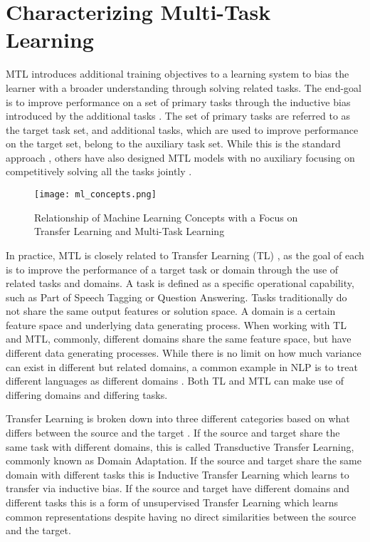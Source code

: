 \documentclass[twocolumn]{article}
\begin{document}
\section{Characterizing Multi-Task Learning}
MTL introduces additional training objectives to a learning system to bias the learner with a broader understanding through solving related tasks. The end-goal is to improve performance on a set of primary tasks through the inductive bias introduced by the additional tasks \citep{mtl97}. The set of primary tasks are referred to as the target task set, and additional tasks, which are used to improve performance on the target set, belong to the auxiliary task set. While this is the standard approach \citep{mtloverview17}, others have also designed MTL models with no auxiliary focusing on competitively solving all the tasks jointly \citep{decanlp18}.

\begin{figure*}
	\begin{center}
		\texttt{[image: ml\_concepts.png]}
		\caption{Relationship of Machine Learning Concepts with a Focus on Transfer Learning and Multi-Task Learning}
		\label{ml_concepts}
	\end{center}
\end{figure*}

In practice, MTL is closely related to Transfer Learning (TL) \citep{learn2learn98}, as the goal of each is to improve the performance of a target task or domain through the use of related tasks and domains. A task is defined as a specific operational capability, such as Part of Speech Tagging or Question Answering. Tasks traditionally do not share the same output features or solution space. A domain is a certain feature space and underlying data generating process. When working with TL and MTL, commonly, different domains share the same feature space, but have different data generating processes. While there is no limit on how much variance can exist in different but related domains, a common example in NLP is to treat different languages as different domains \citep{tlmt16}. Both TL and MTL can make use of differing domains and differing tasks.
	
Transfer Learning is broken down into three different categories based on what differs between the source and the target \citep{advancedda19}. If the source and target share the same task with different domains, this is called Transductive Transfer Learning, commonly known as Domain Adaptation. If the source and target share the same domain with different tasks this is Inductive Transfer Learning which learns to transfer via inductive bias. If the source and target have different domains and different tasks this is a form of unsupervised Transfer Learning which learns common representations despite having no direct similarities between the source and the target.
\end{document}
